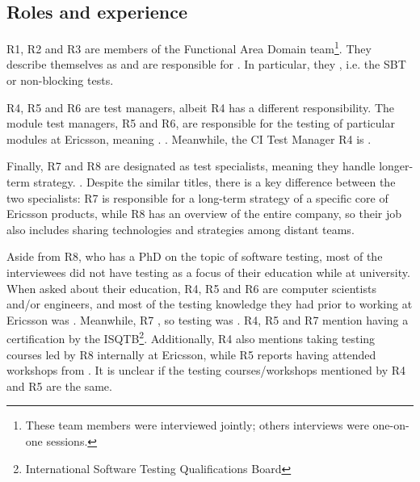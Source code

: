 \subsection{Roles and experience}

R1, R2 and R3 are members of the Functional Area Domain team\footnote{These team members were interviewed jointly; others interviews were one-on-one sessions.}.
They describe themselves as  and are responsible for .
In particular, they , i.e. the SBT or non-blocking tests.

R4, R5 and R6 are test managers, albeit R4 has a different responsibility.
The module test managers, R5 and R6, are responsible for the testing of particular modules at Ericsson, meaning .
.
Meanwhile, the CI Test Manager R4 is .

Finally, R7 and R8 are designated as test specialists, meaning they handle longer-term strategy.
.
Despite the similar titles, there is a key difference between the two specialists: R7 is responsible for a long-term strategy of a specific core of Ericsson products, while R8 has an overview of the entire company, so their job also includes sharing technologies and strategies among distant teams.

Aside from R8, who has a PhD on the topic of software testing, most of the interviewees did not have testing as a focus of their education while at university.
When asked about their education, R4, R5 and R6 are computer scientists and/or engineers, and most of the testing knowledge they had prior to working at Ericsson was .
Meanwhile, R7 , so testing was .
R4, R5 and R7 mention having a certification by the ISQTB\footnote{International Software Testing Qualifications Board}.
Additionally, R4 also mentions taking testing courses led by R8 internally at Ericsson, while R5 reports having attended workshops from .
It is unclear if the testing courses/workshops mentioned by R4 and R5 are the same.

